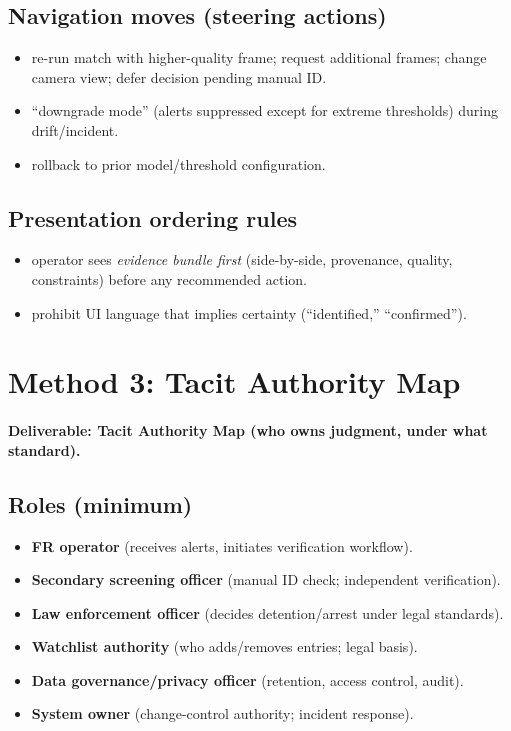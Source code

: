 \subsection*{Navigation moves (steering actions)}
\begin{itemize}
  \item re-run match with higher-quality frame; request additional frames; change camera view; defer decision pending manual ID.
  \item “downgrade mode” (alerts suppressed except for extreme thresholds) during drift/incident.
  \item rollback to prior model/threshold configuration.
\end{itemize}

\subsection*{Presentation ordering rules}
\begin{itemize}
  \item operator sees \emph{evidence bundle first} (side-by-side, provenance, quality, constraints) before any recommended action.
  \item prohibit UI language that implies certainty (“identified,” “confirmed”).
\end{itemize}

\section{Method 3: Tacit Authority Map}
\label{sec:airport-m3}

\paragraph{Deliverable: Tacit Authority Map (who owns judgment, under what standard).}

\subsection*{Roles (minimum)}
\begin{itemize}
  \item \textbf{FR operator} (receives alerts, initiates verification workflow).
  \item \textbf{Secondary screening officer} (manual ID check; independent verification).
  \item \textbf{Law enforcement officer} (decides detention/arrest under legal standards).
  \item \textbf{Watchlist authority} (who adds/removes entries; legal basis).
  \item \textbf{Data governance/privacy officer} (retention, access control, audit).
  \item \textbf{System owner} (change-control authority; incident response).
\end{itemize}

